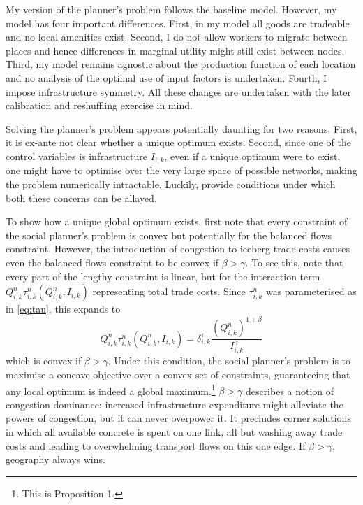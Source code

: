 \documentclass[11pt, oneside]{article}   	%
\begin{document}
My version of the planner's problem follows the baseline \cite{fajgelbaum_optimal_2017} model. However, my model has four important differences. First, in my model all goods are tradeable and no local amenities exist. Second, I do not allow workers to migrate between places and hence differences in marginal utility might still exist between nodes. Third, my model remains agnostic about the production function of each location and no analysis of the optimal use of input factors is undertaken. Fourth, I impose infrastructure symmetry. All these changes are undertaken with the later calibration and reshuffling exercise in mind.

Solving the planner's problem appears potentially daunting for two reasons. First, it is ex-ante not clear whether a unique optimum exists. Second, since one of the control variables is infrastructure $I_{i,k}$, even if a unique optimum were to exist, one might have to optimise over the very large space of possible networks, making the problem numerically intractable. Luckily, \cite{fajgelbaum_optimal_2017} provide conditions under which both these concerns can be allayed.

To show how a unique global optimum exists, first note that every constraint of the social planner's problem is convex but potentially for the balanced flows constraint. However, the introduction of congestion to iceberg trade costs causes even the balanced flows constraint to be convex if $\beta > \gamma$. To see this, note that every part of the lengthy constraint is linear, but for the interaction term $Q_{i,k}^{n}\tau_{i,k}^{n}(Q_{i,k}^{n}, I_{i,k})$ representing total trade costs. Since $\tau_{i,k}^{n}$ was parameterised as in \eqref{eq:tau}, this expands to
\begin{equation}
  Q_{i,k}^{n}\tau_{i,k}^{n}(Q_{i,k}^{n}, I_{i,k}) = \delta^{\tau}_{i,k} \frac{(Q_{i,k}^{n})^{1+\beta}}{I_{i,k}^{\gamma}}
\end{equation}
which is convex if $\beta > \gamma$. Under this condition, the social planner's problem is to maximise a concave objective over a convex set of constraints, guaranteeing that any local optimum is indeed a global maximum.\footnote{This is \citeauthor{fajgelbaum_optimal_2017} Proposition 1.} $\beta > \gamma$ describes a notion of congestion dominance: increased infrastructure expenditure might alleviate the powers of congestion, but it can never overpower it. It precludes corner solutions in which all available concrete is spent on one link, all but washing away trade costs and leading to overwhelming transport flows on this one edge. If $\beta > \gamma$, geography always wins.
\end{document}
